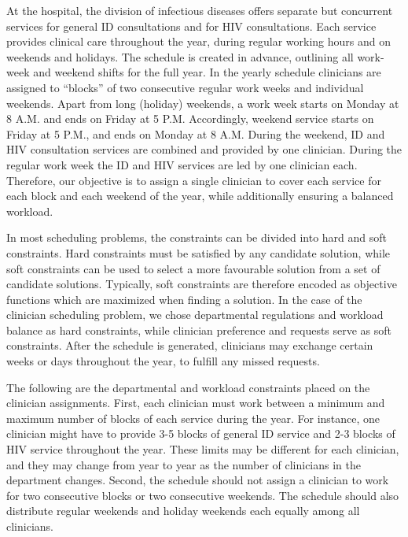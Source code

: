 At the hospital, the division of infectious diseases offers
separate but concurrent services for general ID consultations and for HIV consultations. Each
service provides clinical care throughout the year, during regular working hours
and on weekends and holidays. The schedule is created in advance,
outlining all work-week and weekend shifts for the full year.
In the yearly schedule clinicians are assigned to ``blocks'' of
two consecutive regular work weeks and individual weekends. Apart
from long (holiday) weekends, a work week starts on Monday at 8 A.M. and ends on
Friday at 5 P.M. Accordingly, weekend service starts on Friday at 5 P.M., and
ends on Monday at 8 A.M. During the weekend, ID and HIV consultation services
are combined and provided by one clinician. During the regular work week the ID
and HIV services are led by one clinician each.
Therefore, our objective is to assign a single clinician to cover
each service for each block and each weekend of the year, while 
additionally ensuring a balanced workload.

In most scheduling problems, the constraints can be divided into hard and soft
constraints. Hard constraints must be satisfied by any candidate solution, while
soft constraints can be used to select a more favourable solution from a set of
candidate solutions. Typically, soft constraints are therefore encoded as objective
functions which are
maximized when finding a solution. In the case of the clinician
scheduling problem, we chose departmental regulations and workload balance as hard constraints,
while clinician preference and requests serve as soft constraints.
After the schedule is generated, clinicians may
exchange certain weeks or days throughout the year, to fulfill any missed requests.

The following are the departmental and workload constraints placed on the clinician assignments. 
First, each clinician
must work between a minimum and maximum number of blocks of each service during the year.
For instance, one clinician might have to
provide 3-5 blocks of general ID service and 2-3 blocks of HIV service
throughout the year. These limits may be different for each clinician,
and they may change from year to year as
the number of clinicians in the department changes. Second, the schedule
should not assign a clinician to work for two consecutive blocks or two
consecutive weekends. The schedule should also distribute regular
weekends and holiday weekends each equally among all clinicians.

